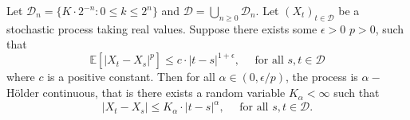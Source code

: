 \documentclass{article}
\begin{document}
\begin{theorem}\label{thm: kolmogorov continuity criterion}
	Let $ \mathcal{D}_{n} = \{K\cdot 2^{-n}: 0\leq k \leq 2^{n}\}$ and $ \mathcal{D} = \displaystyle\bigcup_{n\geq 0} \mathcal{D}_{n}$. Let $ (X_{t})_{t\in \mathcal{D}}$ be a stochastic process taking real values. Suppose there exists some $ \epsilon>0$ $ p>0$, such that
	\[
	\mathbb{E}\left[ |X_{t}-X_{s}|^{p} \right]\leq c\cdot |t-s|^{1+\epsilon}, \quad \text{ for all }s,t\in \mathcal{D}
	\]
	where $ c$ is a positive constant. Then for all $ \alpha \in (0, \epsilon/p)$, the process is $ \alpha-$H\"{o}lder continuous, that is there exists a random variable $ K_{\alpha}<\infty$ such that
	\[
	|X_{t}-X_{s}|\leq K_{\alpha}\cdot |t-s|^{\alpha}, \quad \text{ for all } s,t\in \mathcal{D}.
	\]
\end{theorem}
\end{document}
